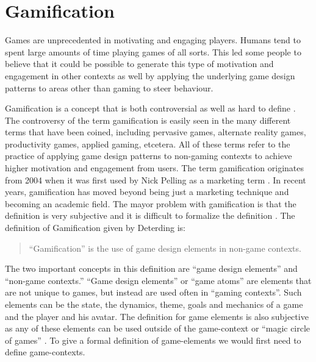 \documentclass[11pt]{article}
\begin{document}






\section{Gamification}
Games are unprecedented in motivating and engaging players. Humans tend to spent large amounts of time playing games of all sorts. This led some people to believe that it could be possible to generate this type of motivation and engagement in other contexts as well by applying the underlying game design patterns to areas other than gaming to steer behaviour.

Gamification is a concept that is both controversial \cite{McGonigal2011} as well as hard to define \cite{Deterding2011}. The controversy of the term gamification is easily seen in the many different terms that have been coined, including pervasive games, alternate reality games, productivity games, applied gaming, etcetera. All of these terms refer to the practice of applying game design patterns to non-gaming contexts to achieve higher motivation and engagement from users. The term gamification originates from 2004 when it was first used by Nick Pelling as a marketing term \cite{Huotari2012}. In recent years, gamification has moved beyond being just a marketing technique and becoming an academic field. The mayor problem with gamification is that the definition is very subjective and it is difficult to formalize the definition \cite{Huotari2012, Deterding2011}. 
%
The definition of Gamification given by Deterding is:
\begin{quote}
	``Gamification'' is the use of game design elements in non-game contexts. 
\end{quote}

The two important concepts in this definition are ``game design elements'' and ``non-game contexts.'' ``Game design elements'' or ``game atoms'' \cite{Deterding2011, Brathwaite2008} are elements that are not unique to games, but instead are used often in ``gaming contexts''. Such elements can be the state, the dynamics, theme, goals and mechanics of a game and the player and his avatar. The definition for game elements is also subjective as any of these elements can be used outside of the game-context or ``magic circle of games'' \cite{Huizinga}. To give a formal definition of game-elements we would first need to define game-contexts.
\end{document}
